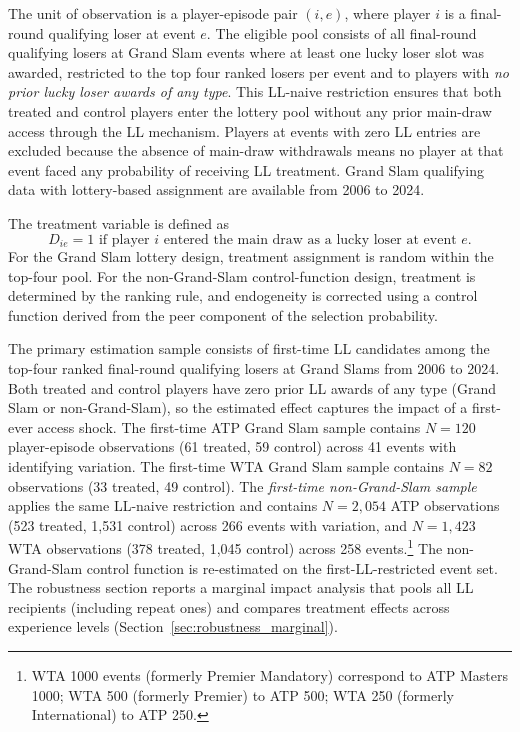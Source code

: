 The unit of observation is a player-episode pair $(i, e)$, where player $i$ is a final-round qualifying loser at event $e$. The eligible pool consists of all final-round qualifying losers at Grand Slam events where at least one lucky loser slot was awarded, restricted to the top four ranked losers per event and to players with \textit{no prior lucky loser awards of any type}. This LL-naive restriction ensures that both treated and control players enter the lottery pool without any prior main-draw access through the LL mechanism. Players at events with zero LL entries are excluded because the absence of main-draw withdrawals means no player at that event faced any probability of receiving LL treatment. Grand Slam qualifying data with lottery-based assignment are available from 2006 to 2024.

The treatment variable is defined as
\[
D_{ie} = 1 \text{ if player } i \text{ entered the main draw as a lucky loser at event } e.
\]
For the Grand Slam lottery design, treatment assignment is random within the top-four pool. For the non-Grand-Slam control-function design, treatment is determined by the ranking rule, and endogeneity is corrected using a control function derived from the peer component of the selection probability.

The primary estimation sample consists of first-time LL candidates among the top-four ranked final-round qualifying losers at Grand Slams from 2006 to 2024. Both treated and control players have zero prior LL awards of any type (Grand Slam or non-Grand-Slam), so the estimated effect captures the impact of a first-ever access shock. The first-time ATP Grand Slam sample contains $N = 120$ player-episode observations (61 treated, 59 control) across 41 events with identifying variation. The first-time WTA Grand Slam sample contains $N = 82$ observations (33 treated, 49 control). The \textit{first-time non-Grand-Slam sample} applies the same LL-naive restriction and contains $N = 2{,}054$ ATP observations (523 treated, 1,531 control) across 266 events with variation, and $N = 1{,}423$ WTA observations (378 treated, 1,045 control) across 258 events.\footnote{WTA 1000 events (formerly Premier Mandatory) correspond to ATP Masters 1000; WTA 500 (formerly Premier) to ATP 500; WTA 250 (formerly International) to ATP 250.} The non-Grand-Slam control function is re-estimated on the first-LL-restricted event set. The robustness section reports a marginal impact analysis that pools all LL recipients (including repeat ones) and compares treatment effects across experience levels (Section~\ref{sec:robustness_marginal}).

